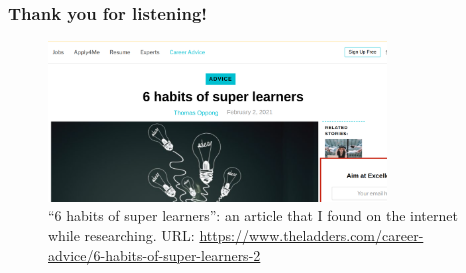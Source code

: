 \documentclass{beamer}
\begin{document}
\begin{frame}
    \frametitle{Thank you for listening!} 
    \begin{figure}[H]
        \centering
        \includegraphics[width=0.8\textwidth]{figures/6habits.png}
        \caption{``6 habits of super learners'': an article that I found on the internet while researching. URL: \url{https://www.theladders.com/career-advice/6-habits-of-super-learners-2}}
    \end{figure}
\end{frame}
 
\end{document}
